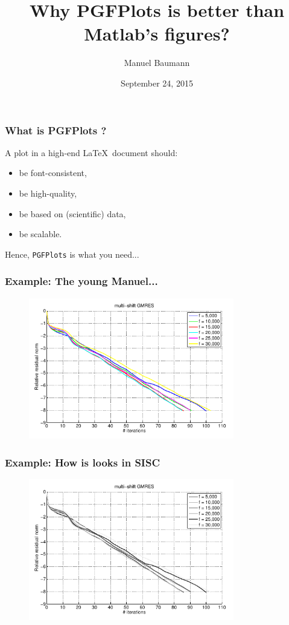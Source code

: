 \documentclass{beamer}
\title{\huge{Why PGFPlots is better than Matlab's figures?}}
\author{Manuel Baumann}
\date{\footnotesize{September 24, 2015}}
\begin{document}
\frame{\titlepage}
\begin{frame}
\frametitle{What is PGFPlots ?}
A plot in a high-end \LaTeX \ document should:
\begin{itemize}
 \item be font-consistent,
 \item be high-quality,
 \item be based on (scientific) data,
 \item be scalable.
\end{itemize}
\pause
Hence, \texttt{PGFPlots} is what you need...
\end{frame}

\begin{frame}
\frametitle{Example: The young Manuel...}
\begin{figure}
 \includegraphics[width=0.8\textwidth]{images/matlab.png}
\end{figure}
\end{frame}

\begin{frame}
\frametitle{Example: How is looks in SISC}
\begin{figure}
 \includegraphics[width=0.8\textwidth]{images/matlab_bw.png}
\end{figure}
\end{frame}
\end{document}
